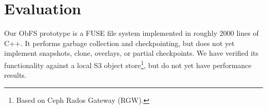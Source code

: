 \section{Evaluation}
\label{sec:evaluation}

Our ObFS prototype is a FUSE file system implemented in roughly 2000 lines of C++.
It performs garbage collection and checkpointing, but does not yet implement snapshots, clone, overlays, or partial checkpoints.
We have verified its functionality against a local S3 object store\footnote{Based on Ceph Rados Gateway (RGW).}, but do not yet have performance results.

